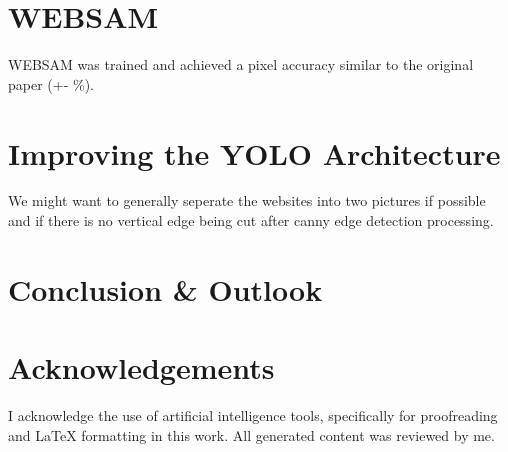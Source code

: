 \documentclass{article}  %
\begin{document}
\section{WEBSAM}
WEBSAM was trained and achieved a pixel accuracy similar to the original paper (+- \%). 

\section{Improving the YOLO Architecture}
We might want to generally seperate the websites into two pictures if possible and if there is no vertical edge being cut after canny edge detection processing.

\section{Conclusion \& Outlook}

\section{Acknowledgements}

I acknowledge the use of artificial intelligence tools, specifically for proofreading and LaTeX formatting in this work. All generated content was reviewed by me.
\end{document}
